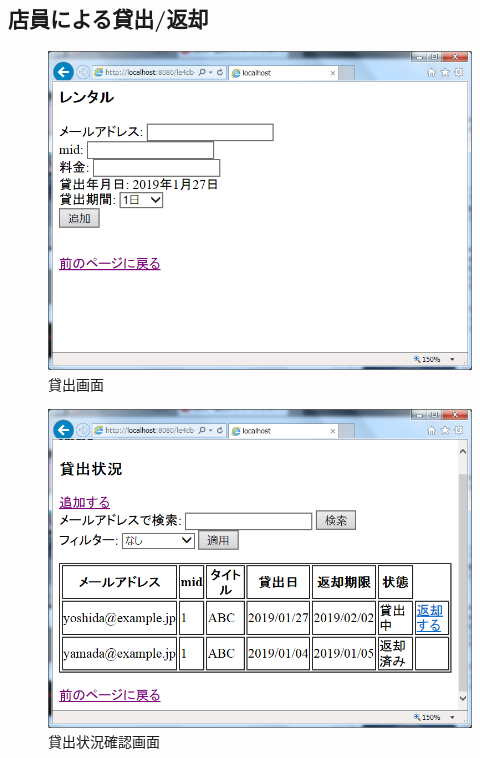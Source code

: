 \documentclass{jarticle}
\begin{document}
\subsection{店員による貸出/返却}
\begin{figure}[tp]
\begin{center}
\includegraphics[scale=0.5]{rental.png}
\end{center}
\caption{貸出画面}
\label{fig:rental}
\end{figure}
\begin{figure}[tp]
\begin{center}
\includegraphics[scale=0.5]{return.png}
\end{center}
\caption{貸出状況確認画面}
\label{fig:return}
\end{figure}
\end{document}
